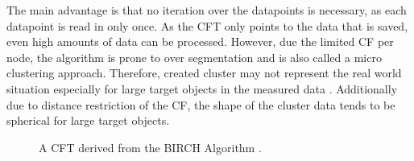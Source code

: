    The main advantage is that no iteration over the datapoints is necessary, as each datapoint is read in only once. As the \ac{CFT} only points to the data that is saved, even high amounts of data can be processed. However, due the limited \ac{CF} per node, the algorithm is prone to over segmentation and is also called a micro clustering approach. Therefore, created cluster may not represent the real world situation especially for large target objects in the measured data \cite{EnvPerc}. Additionally due to distance restriction of the \ac{CF}, the shape of the cluster data tends to be spherical for large target objects.
 
\begin{figure}
	\begin{centering}
	
\caption{A \ac{CFT} derived from the \ac{BIRCH} Algorithm \cite{EnvPerc}.}
\label{fig_BIRCHTree}%
\end{centering}
\end{figure}
